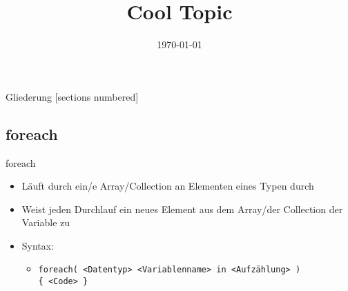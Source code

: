 



\title{Cool Topic}
\date{\today}




\maketitle

\begin{frame}{Gliederung}
	[sections numbered]
	\tableofcontents
\end{frame}


\subsection{foreach}
\begin{frame}{foreach}
	\begin{itemize}
		\item Läuft durch ein/e Array/Collection an Elementen eines Typen durch 
		\item Weist jeden Durchlauf ein neues Element aus dem Array/der Collection der Variable zu 
		\item Syntax:
		\begin{itemize}
			\item \texttt{foreach( \alert{<Datentyp> <Variablenname>} in \alert{<Aufzählung>} )\\ \{ \alert{<Code>} \}}
		\end{itemize}
	\end{itemize}
		
\end{frame}





